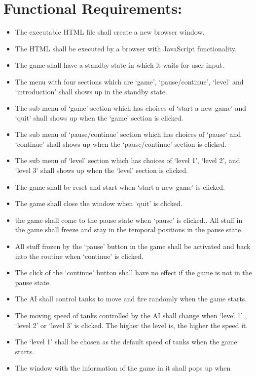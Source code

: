 \documentclass{article}
\begin{document}
\section {Functional Requirements:}
\begin{itemize}
\item The executable HTML file shall create a new browser window.
\item The HTML shall be executed by a browser with JavaScript functionality.
\item The game shall have a standby state in which it waits for user input.
\item The menu with four sections which are `game', `pause/continue', `level' and
 `introduction' shall shows up in the standby state.
\item The sub menu of `game' section which has choices of `start a new game' and 
`quit' shall shows up when the `game' section is clicked.
\item The sub menu of  `pause/continue' section which has choices of `pause‘ and  
`continue' shall shows up when the `pause/continue' section is clicked.
\item The sub menu of  `level' section which has choices of `level 1', `level 2',
 and `level 3' shall shows up when the `level' section is clicked.
\item The game shall be reset and start when `start a new game' is clicked.
\item The game shall close the window when `quit' is clicked.
\item the game shall come to the pause state when `pause' is clicked.. All stuff 
in the game shall freeze and stay in the temporal positions in the pause state.
\item All stuff frozen by the `pause' button in the game shall be activated and
 back into the routine when `continue' is clicked.
\item The click of the `continue' button shall have no effect if the game is not
 in the pause state.
\item The AI shall control tanks to move and fire randomly when the game starts.
\item The moving speed of tanks controlled by the AI shall change when `level 1'
, `level 2' or `level 3' is clicked. The higher the level is, the higher the speed
 it.
\item The `level 1' shall be chosen as the default speed of tanks when the game 
starts.
\item The window with the information of the game in it shall pops up when 

\end{itemize}
\end{document}

